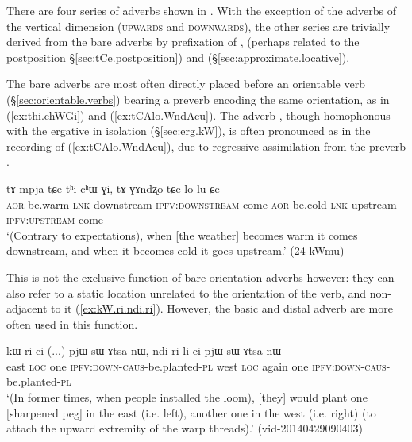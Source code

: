 There are four series of adverbs shown in . With the exception of the adverbs of the vertical dimension (\textsc{upwards} and \textsc{downwards}), the other series are trivially derived from the bare adverbs by prefixation of ,  (perhaps related to the postposition  §\ref{sec:tCe.postposition}) and  (§\ref{sec:approximate.locative}).

The bare adverbs are most often directly placed before an orientable verb (§\ref{sec:orientable.verbs}) bearing a preverb encoding the same orientation, as in (\ref{ex:thi.chWGi}) and (\ref{ex:tCAlo.WndAcu}). The adverb , though homophonous with the ergative in isolation (§\ref{sec:erg.kW}), is often pronounced  as in the recording of (\ref{ex:tCAlo.WndAcu}), due to regressive assimilation from the preverb .

 \begin{exe}
\ex \label{ex:thi.chWGi}
\gll tɤ-mpja tɕe tʰi cʰɯ-ɣi, tɤ-ɣɤndʐo tɕe lo lu-ɕe \\
\textsc{aor}-be.warm \textsc{lnk} downstream \textsc{ipfv}:\textsc{downstream}-come \textsc{aor}-be.cold  \textsc{lnk} upstream \textsc{ipfv}:\textsc{upstream}-come \\
\glt `(Contrary to expectations), when [the weather] becomes warm it comes downstream, and when it becomes cold it goes upstream.' (24-kWmu)
 \end{exe}

This is not the exclusive function of bare orientation adverbs however: they can also refer to a static location unrelated to the orientation of the verb, and non-adjacent to it (\ref{ex:kW.ri.ndi.ri}). However, the basic and distal adverb are more often used in this function.

\begin{exe}
\ex \label{ex:kW.ri.ndi.ri}
\gll kɯ ri ci (...) pjɯ-sɯ-ɤtsa-nɯ, ndi ri li ci pjɯ-sɯ-ɤtsa-nɯ   \\
east \textsc{loc} one {  } \textsc{ipfv}:\textsc{down}-\textsc{caus}-be.planted-\textsc{pl} 
west \textsc{loc} again one \textsc{ipfv}:\textsc{down}-\textsc{caus}-be.planted-\textsc{pl}  \\
\glt `(In former times, when people installed the loom), [they] would plant one [sharpened peg] in the east (i.e. left), another one in the west (i.e. right) (to attach the upward extremity of the warp threads).' (vid-20140429090403)
 \end{exe}
 
